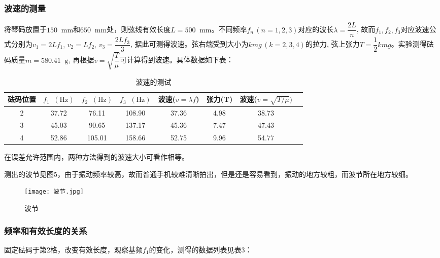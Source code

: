 \documentclass[11pt]{article}
\newcommand*{\unit}[1]{\mathop{}\!\mathrm{#1}}
\begin{document}
\subsubsection{波速的测量}

将琴码放置于$150\unit{mm}$和$650\unit{mm}$处，则弦线有效长度$L=500\unit{mm}$。不同频率$f_n\,(n=1,2,3)$对应的波长$\lambda=\dfrac{2L}{n}$, 故而$f_1,f_2,f_3$对应波速公式分别为$v_1=2Lf_1,\,v_2=Lf_2,\,v_3=\dfrac{2Lf_3}{3}$, 据此可测得波速。弦右端受到大小为$kmg \,(k = 2,3,4)$的拉力, 弦上张力$T = \dfrac{1}{2}kmg$。实验测得砝码质量$m = 580.41\unit{g}$, 再根据$v = \sqrt{\dfrac{T}{\mu}}$可计算得到波速。具体数据如下表：

\begin{table}[H]
    \centering
    \caption{波速的测试}
    \begin{tabular}{|c|c|c|c|c|c|c|c|}
        \hline
        砝码位置& $f_1 \unit{(Hz)}$ & $f_2 \unit{(Hz)}$ &$ f_3 \unit{(Hz)}$ &波速($v=\lambda f$)&张力(T)&波速($v=\sqrt{T/\mu})$\\ \hline
        2     & 37.72  & 76.11  & 108.90  & 37.36  & 4.98  & 38.73  \\ 
        \hline
        3     & 45.03  & 90.65  & 137.17  & 45.36  & 7.47  & 47.43  \\ 
        \hline
        4     & 52.86  & 105.01  & 158.66  & 52.75  & 9.96  & 54.77  \\ 
        \hline
    \end{tabular}
\end{table}

在误差允许范围内，两种方法得到的波速大小可看作相等。

测出的波节见图5，由于振动频率较高，故而普通手机较难清晰拍出，但是还是容易看到，振动的地方较粗，而波节所在地方较细。

\begin{figure}[H]
    \centering
    \texttt{[image: 波节.jpg]}
\caption{波节}
\end{figure}







\subsubsection{频率和有效长度的关系}

固定砝码于第2格，改变有效长度，观察基频$f_1$的变化，测得的数据列表见表3：
\end{document}
